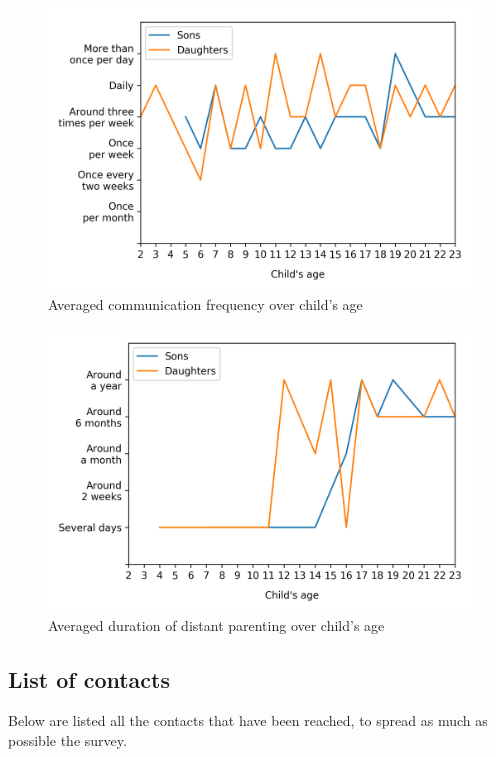 \begin{figure}[H]
    \centering
    \includegraphics[scale=0.58]{plots/plot_11.png}
    \caption{Averaged communication frequency over child's age}
    \label{fig:plot_11}
\end{figure}

\begin{figure}[H]
    \centering
    \includegraphics[scale=0.58]{plots/plot_EXTRA.png}
    \caption{Averaged duration of distant parenting over child's age}
    \label{fig:plot_EXTRA}
\end{figure}



\subsection{List of contacts}
\label{appendix:contacts_list}
Below are listed all the contacts that have been reached, to spread as much as possible the survey.

